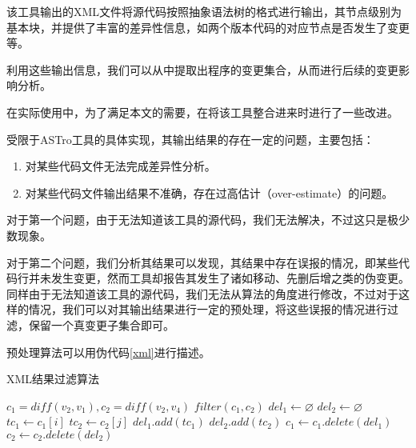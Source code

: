 该工具输出的XML文件将源代码按照抽象语法树的格式进行输出，其节点级别为基本块，并提供了丰富的差异性信息，如两个版本代码的对应节点是否发生了变更等。

利用这些输出信息，我们可以从中提取出程序的变更集合，从而进行后续的变更影响分析。

在实际使用中，为了满足本文的需要，在将该工具整合进来时进行了一些改进。


受限于ASTro工具的具体实现，其输出结果的存在一定的问题，主要包括：
\begin{enumerate}
	\item 对某些代码文件无法完成差异性分析。
	\item 对某些代码文件输出结果不准确，存在过高估计（over-estimate）的问题。
\end{enumerate}

对于第一个问题，由于无法知道该工具的源代码，我们无法解决，不过这只是极少数现象。

对于第二个问题，我们分析其结果可以发现，其结果中存在误报的情况，即某些代码行并未发生变更，然而工具却报告其发生了诸如移动、先删后增之类的伪变更。同样由于无法知道该工具的源代码，我们无法从算法的角度进行修改，不过对于这样的情况，我们可以对其输出结果进行一定的预处理，将这些误报的情况进行过滤，保留一个真变更子集合即可。

预处理算法可以用伪代码\ref {xml}进行描述。

\begin{algorithm}
	\caption{XML结果过滤算法}
	\label{xml}
	\begin{algorithmic}[1]
		\Require $c_1 = diff(v_2, v_1), c_2 = diff(v_2,v_4)$
		\Ensure $filter(c_1, c_2)$
		\State $del_1 \gets \varnothing$
		\State $del_2 \gets \varnothing$
		\State $tc_1 \gets c_1[i]$
		\State $tc_2 \gets c_2[j]$
		\State $del_1.add(tc_1)$
		\State $del_2.add(tc_2)$
		\EndIf	
		\EndFor
		\EndFor
		\State $c_1 \gets c_1.delete(del_1)$
		\State $c_2 \gets c_2.delete(del_2)$
	\end{algorithmic}
\end{algorithm}

